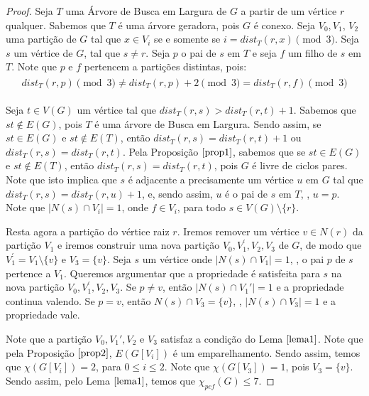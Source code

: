\documentclass[12pt]{article}
\begin{document}
 \begin{proof}
 	Seja $T$ uma Árvore de Busca em Largura de $G$ a partir de um vértice $r$ qualquer. Sabemos que $T$ é uma árvore geradora, pois $G$ é conexo. Seja $V_0, V_1$, $V_2$ uma partição de $G$ tal que $x \in V_i$ se e somente se $i = dist_T(r, x) \pmod{3} $. Seja $s$ um vértice de $G$, tal que $s \neq r$. Seja $p$ o pai de $s$ em $T$ e seja $f$ um filho de $s$ em $T$.
 	Note que $p$ e $f$ pertencem a partições distintas, pois:
 	\begin{align}
 		\begin{split}
 			dist_T(r, p) \pmod{3} \neq dist_T(r, p) + 2 \pmod{3} = dist_T(r, f) \pmod{3}
 		\end{split} 
 	\end{align} 
   
 	 Seja $t \in V(G)$ um vértice tal que $dist_T(r, s) > dist_T(r, t) + 1$. Sabemos que $st \notin E(G)$, pois $T$ é uma árvore de Busca em Largura. Sendo assim, se $st \in E(G)$ e $st \notin E(T)$, então $dist_T(r, s) = dist_T(r, t) + 1$ ou $dist_T(r, s) = dist_T(r, t)$. Pela Proposição $\ref{prop1}$, sabemos que se $st \in E(G)$ e $st \notin E(T)$, então $dist_T(r, s) = dist_T(r, t)$, pois $G$ é livre de ciclos pares. Note que isto implica que $s$ é adjacente a precisamente um vértice $u$ em $G$ tal que $dist_T(r, s) = dist_T(r, u) + 1$, e, sendo assim, $u$ é o pai de $s$ em $T$, \ie, $u = p$. Note que $|N(s) \cap V_i| = 1$, onde $f \in V_i$, para todo $s \in V(G) \setminus\{r\}$. \newl
 	 
 	 Resta agora a partição do vértice raiz $r$. Iremos remover um vértice $v \in N(r)$ da partição $V_1$ e iremos construir uma nova partição $V_0, V^{'}_1, V_2, V_3$ de $G$, de modo que $V^{'}_1 = V_1\setminus\{v\}$ e $V_3 = \{v\}$. Seja $s$ um vértice onde $|N(s) \cap V_1| = 1$, \ie, o pai $p$ de $s$ pertence a $V_1$. Queremos argumentar que a propriedade é satisfeita para $s$ na nova partição $V_0, V^{'}_1, V_2, V_3$. Se $p \neq v$, então $|N(s) \cap V_1'| = 1$ e a propriedade continua valendo. Se $p = v$, então $N(s) \cap V_3 = \{v\}$, \ie, $ |N(s) \cap V_3| = 1$ e a propriedade vale. \newl
 	 
 	 Note que a partição $V_0, V_1', V_2 \text{ e } V_3$ satisfaz a condição do Lema $\ref{lema1}$. Note que pela Proposição $\ref{prop2}$, $E(G[V_i])$ é um emparelhamento. Sendo assim, temos que $\chi(G[V_i]) = 2$, para $0 \leq i \leq 2$. Note que $\chi(G[V_3]) = 1$, pois $V_3 = \{v\}$. Sendo assim, pelo Lema $\ref{lema1}$, temos que $\chi_{pcf}(G) \leq 7$.
  
 \end{proof}  \newpage
 
\end{document}
